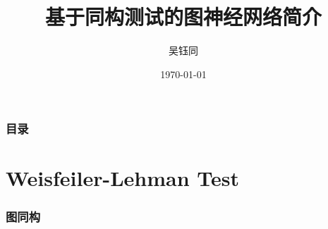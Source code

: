 \documentclass{beamer}
\title %
{基于同构测试的图神经网络简介}
\author %
{吴钰同}
\date %
{\today}
\begin{document}
\frame{\titlepage}


\begin{frame}
\frametitle{目录}
\tableofcontents
\end{frame}


\section{Weisfeiler-Lehman Test}

\begin{frame}

  \frametitle{图同构}


\end{frame}
\end{document}
